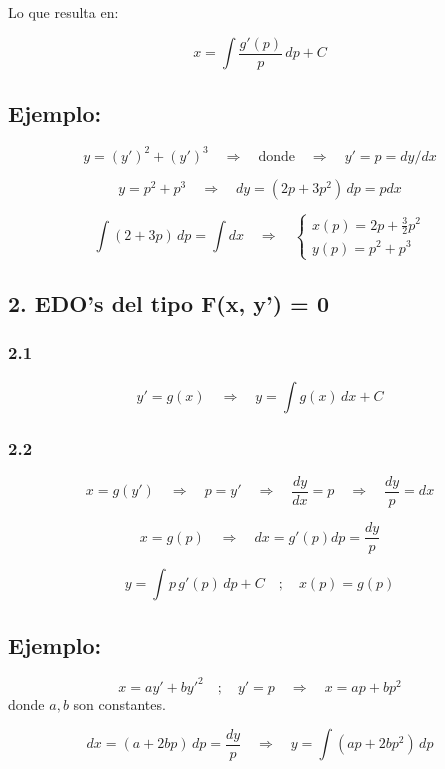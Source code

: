 \documentclass[a4paper,12pt]{article}
\begin{document}
\medskip
\noindent
Lo que resulta en:

\[
x = \int \frac{g'(p)}{p}\, dp + C
\]

\subsection*{Ejemplo:}
\vspace{-1.2em}
\[
y = (y')^2 + (y')^3 \quad \Rightarrow \quad \text{donde} \quad \Rightarrow \quad y' = p = dy/dx
\]

\[
y = p^2 + p^3 \quad \Rightarrow \quad dy = (2p + 3p^2)\, dp = pdx
\]

\[
\int (2 + 3p)\, dp = \int dx \quad \Rightarrow \quad
\begin{cases}
x(p) = 2p + \tfrac{3}{2} p^2 \\[6pt]
y(p) = p^2 + p^3
\end{cases}
\]

\subsection*{2. EDO's del tipo F(x, y') = 0} 

\subsubsection*{2.1}
\vspace{-1.2em}
\[
y' = g(x) \quad \Rightarrow \quad y = \int g(x)\, dx + C
\]

\subsubsection*{2.2}
\vspace{-1.2em}
\[
x = g(y') \quad \Rightarrow \quad p = y' \quad \Rightarrow \quad \frac{dy}{dx} = p
\quad \Rightarrow \quad \frac{dy}{p} = dx
\]

\[
x = g(p) \quad \Rightarrow \quad dx = g'(p)dp = \frac{dy}{p}
\]

\[
y = \int p\, g'(p)\, dp + C \quad ; \quad x(p) = g(p)
\]
\subsection*{Ejemplo:}

\[
x = ay' + by'^2 \quad ; \quad y' = p \quad \Rightarrow \quad x = ap + bp^2 
\]
donde \(a, b\) son constantes.

\[
dx = (a + 2bp)\, dp = \frac{dy}{p} \quad \Rightarrow \quad y = \int (ap + 2bp^2)\, dp
\]
\end{document}
